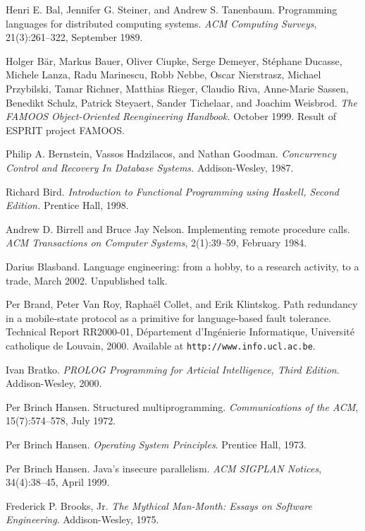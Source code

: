\begin{thebibliography}{213}
Henri E. Bal, Jennifer G. Steiner, and Andrew S. Tanenbaum. Programming languages for distributed computing systems. \emph{ACM Computing Surveys}, 21(3):261–322, September 1989.

Holger B\"ar, Markus Bauer, Oliver Ciupke, Serge Demeyer, St\'ephane Ducasse, Michele Lanza, Radu Marinescu, Robb Nebbe, Oscar Nierstrasz, Michael Przybilski, Tamar Richner, Matthias Rieger, Claudio Riva, Anne-Marie Sassen, Benedikt Schulz, Patrick Steyaert, Sander Tichelaar, and Joachim Weisbrod. \emph{The FAMOOS Object-Oriented Reengineering Handbook.} October 1999. Result of ESPRIT project FAMOOS.

Philip A. Bernstein, Vassos Hadzilacos, and Nathan Goodman. \emph{Concurrency Control and Recovery In Database Systems.} Addison-Wesley, 1987.

Richard Bird. \emph{Introduction to Functional Programming using Haskell, Second Edition.} Prentice Hall, 1998.

Andrew D. Birrell and Bruce Jay Nelson. Implementing remote procedure calls. \emph{ACM Transactions on Computer Systems}, 2(1):39–59, February 1984.

Darius Blasband. Language engineering: from a hobby, to a research activity, to a trade, March 2002. Unpublished talk.

Per Brand, Peter Van Roy, Rapha\"el Collet, and Erik Klintskog. Path redundancy in a mobile-state protocol as a primitive for language-based fault tolerance. Technical Report RR2000-01, D\'epartement d’Ing\'enierie Informatique, Universit\'e catholique de Louvain, 2000. Available at \verb"http://www.info.ucl.ac.be".

Ivan Bratko. \emph{PROLOG Programming for Articial Intelligence, Third Edition}. Addison-Wesley, 2000.

Per Brinch Hansen. Structured multiprogramming. \emph{Communications of the ACM}, 15(7):574–578, July 1972.

Per Brinch Hansen. \emph{Operating System Principles}. Prentice Hall, 1973.

Per Brinch Hansen. Java’s insecure parallelism. \emph{ACM SIGPLAN Notices}, 34(4):38–45, April 1999.

Frederick P. Brooks, Jr. \emph{The Mythical Man-Month: Essays on Software Engineering}. Addison-Wesley, 1975.

\end{thebibliography}
